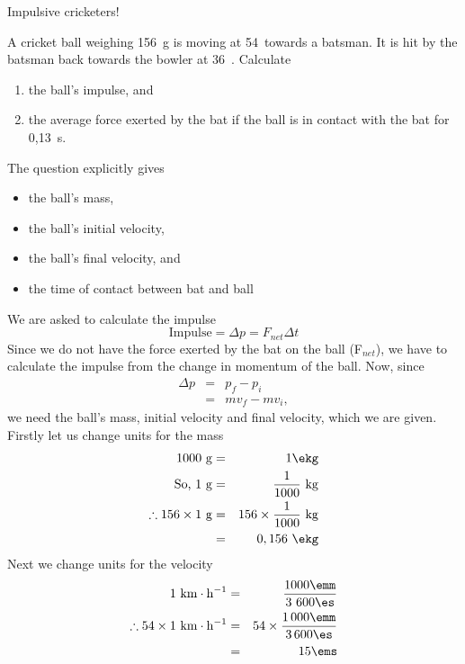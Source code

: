 \begin{wex}{Impulsive cricketers!}{A cricket ball weighing 156~g is moving at 54~\kph towards a batsman. It is hit by the batsman back towards the bowler at 36~\kph. Calculate
\begin{enumerate}
\item the ball's impulse, and
\item the average force exerted by the bat if the ball is in contact with the bat for 0,13~s.
\end{enumerate}}{
The question explicitly gives
\begin{itemize}
\item the ball's mass,
\item the ball's initial velocity,
\item the ball's final velocity, and
\item the time of contact between bat and ball
\end{itemize}

We are asked to calculate the impulse
\begin{equation*}
\mathrm{Impulse} = \Delta p = F_{net}\Delta t
\end{equation*}
Since we do not have the force exerted by the bat on the ball (F$_{net}$), we have to calculate the impulse from the change in momentum of the ball. Now, since 
\begin{eqnarray*}
\Delta p &=& p_{f}-p_{i}\\
&=& mv_f - mv_i,
\end{eqnarray*}
we need the ball's mass, initial velocity and final velocity, which we are given.\\
Firstly let us change units for the mass
\begin{eqnarray*}
1000\ \mathrm{g} &=& 1\ekg\\
\mbox{So, }1\ \mathrm{g} &=& \frac{1}{1000}\ \mathrm{kg}\\
\therefore 156 \times 1\ \mathrm{g} &=& 156 \times \frac{1}{1000}\ \mathrm{kg}\\
&=& 0,156~\ekg
\end{eqnarray*}
Next we change units for the velocity
\begin{eqnarray*}
1\ \mathrm{km\cdot h^{-1}} &=& \frac{1000 \emm}{3\ 600\es}\\
\therefore 54 \times 1\ \mathrm{km\cdot h^{-1}} &=& 54 \times \frac{1\,000 \emm}{3\,600\es}\\
&=&15\ems
\end{eqnarray*}

}
\end{wex}

